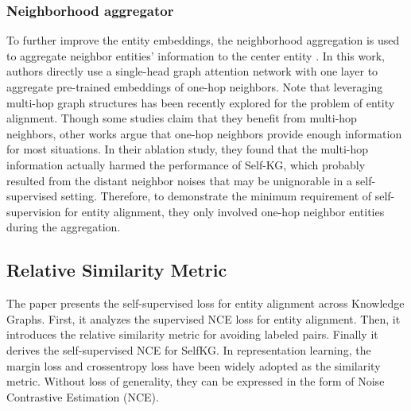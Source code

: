 \documentclass[sigconf]{acmart}
\begin{document}
{\subsubsection{Neighborhood aggregator}
To further improve the entity embeddings, the neighborhood aggregation is used to aggregate neighbor entities’ information to the center entity \cite{wang2018cross,xu2019cross}. In this work, authors directly use a single-head graph attention network \cite{velivckovic2017graph} with one layer to aggregate pre-trained embeddings of one-hop neighbors. Note that leveraging multi-hop graph structures has been recently explored for the problem of entity alignment. Though some studies \cite{fey2020deep,wang2018cross,wu2019relation} claim that they benefit from multi-hop neighbors, other works \cite{xu2019cross,zhang2018mego2vec} argue that one-hop neighbors provide enough information for most situations. In their ablation study, they found that the multi-hop information actually harmed the performance of Self-KG, which probably resulted from the distant neighbor noises that may be unignorable in a self-supervised setting. Therefore, to demonstrate the minimum requirement of self-supervision for entity alignment, they only involved one-hop neighbor entities during the aggregation.
\subsection{Relative Similarity Metric} \label{3.2}
The paper presents the self-supervised loss for entity alignment across Knowledge Graphs. First, it analyzes the supervised NCE loss for entity alignment. Then, it introduces the relative similarity metric for avoiding labeled pairs. Finally it derives the self-supervised NCE for SelfKG. In representation learning, the margin loss \cite{bordes2013translating,tang2020bert} and crossentropy loss \cite{zhang2019oag} have been widely adopted as the similarity metric. Without loss of generality, they can be expressed in the form of Noise Contrastive Estimation (NCE)\cite{gutmann2010noise}.

}
\end{document}
